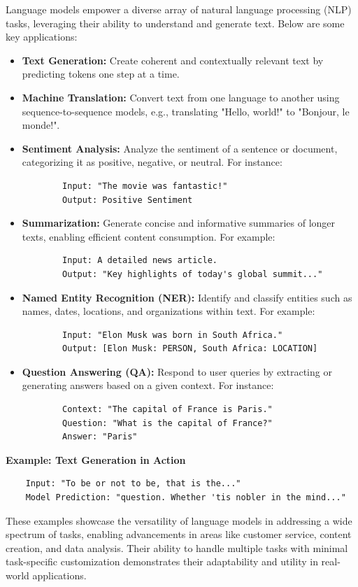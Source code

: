 \begin{flushleft}
    \large Language models empower a diverse array of natural language processing (NLP) tasks, leveraging their ability to understand and generate text. Below are some key applications:

    \begin{itemize}
        \item \textbf{Text Generation:} Create coherent and contextually relevant text by predicting tokens one step at a time.
        \item \textbf{Machine Translation:} Convert text from one language to another using sequence-to-sequence models, e.g., translating "Hello, world!" to "Bonjour, le monde!".
        \item \textbf{Sentiment Analysis:} Analyze the sentiment of a sentence or document, categorizing it as positive, negative, or neutral. For instance:
        \begin{verbatim}
        Input: "The movie was fantastic!"
        Output: Positive Sentiment
        \end{verbatim}
        \item \textbf{Summarization:} Generate concise and informative summaries of longer texts, enabling efficient content consumption. For example:
        \begin{verbatim}
        Input: A detailed news article.
        Output: "Key highlights of today's global summit..."
        \end{verbatim}
        \item \textbf{Named Entity Recognition (NER):} Identify and classify entities such as names, dates, locations, and organizations within text. For example:
        \begin{verbatim}
        Input: "Elon Musk was born in South Africa."
        Output: [Elon Musk: PERSON, South Africa: LOCATION]
        \end{verbatim}
        \item \textbf{Question Answering (QA):} Respond to user queries by extracting or generating answers based on a given context. For instance:
        \begin{verbatim}
        Context: "The capital of France is Paris."
        Question: "What is the capital of France?"
        Answer: "Paris"
        \end{verbatim}
    \end{itemize}

    \textbf{Example: Text Generation in Action}
    \begin{verbatim}
    Input: "To be or not to be, that is the..."
    Model Prediction: "question. Whether 'tis nobler in the mind..."
    \end{verbatim}

    These examples showcase the versatility of language models in addressing a wide spectrum of tasks, enabling advancements in areas like customer service, content creation, and data analysis. Their ability to handle multiple tasks with minimal task-specific customization demonstrates their adaptability and utility in real-world applications.
\end{flushleft}

